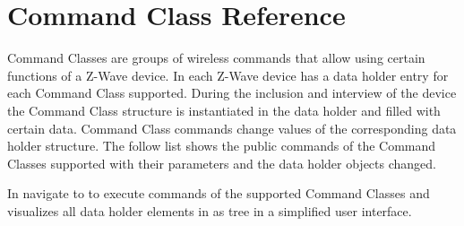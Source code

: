 \chapter{Command Class Reference}
\label{ccs}
\label{CommandClasses}

Command Classes are groups of wireless commands that allow using certain functions of a Z-Wave device.  
In \zway each Z-Wave device has a data holder entry for each Command Class supported. During the inclusion 
and interview of the device the Command Class structure is instantiated in the data holder and filled with 
certain data. Command Class commands change values of the corresponding data holder structure. The follow 
list shows the public commands of the Command Classes supported with their parameters and the data holder 
objects changed.

In \zweui navigate to  to execute commands 
of the supported Command Classes and visualizes all data holder elements in as tree in 
a simplified user interface.
